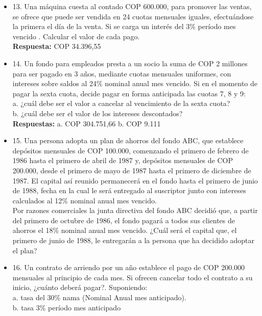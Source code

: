 \begin{itemize}
 \item 13. Una máquina cuesta al contado COP 600.000, para promover las ventas, se ofrece que puede ser vendida en 24 cuotas mensuales iguales, efectuándose la primera el día de la venta. Si se carga un interés del 3\% período mes vencido . Calcular el valor de cada pago.\\
       \textbf{Respuesta:} COP 34.396,55\\
       \medskip

 \item 14. Un fondo para empleados presta a un socio la suma de COP 2 millones para ser pagado en 3 años, mediante cuotas mensuales uniformes, con intereses sobre saldos al 24\% nominal anual mes vencido. Si en el momento de pagar la sexta cuota, decide pagar en forma anticipada las cuotas 7, 8 y 9:\\
       a. ¿cuál debe ser el valor a cancelar al vencimiento de la sexta cuota?\\
       b. ¿cuál debe ser el valor de los intereses descontados?\\
       \textbf{Respuestas:} a. COP 304.751,66 \hspace{1,5cm}b. COP 9.111\\
       \medskip

 \item 15. Una  persona adopta un plan de ahorros del fondo ABC, que establece depósitos mensuales de COP 100.000, comenzando el primero de febrero de 1986 hasta el primero de abril de 1987 y, depósitos mensuales de COP 200.000, desde el primero de mayo de 1987 hasta el primero de diciembre de 1987. El capital así reunido permanecerá en el fondo hasta el primero de junio de 1988, fecha en la cual le será entregado al suscriptor junto con intereses calculados al 12\% nominal anual mes vencido. \\
       Por razones comerciales la junta directiva del fondo ABC decidió que, a partir del primero de octubre de 1986, el fondo pagará a todos sus clientes de ahorros el 18\% nominal anual mes vencido. ¿Cuál será el capital que, el primero de junio de 1988, le entregarán a la persona que ha decidido adoptar el plan?\\
       \medskip

 \item 16. Un contrato de arriendo por un año establece el pago de COP 200.000 mensuales al principio de cada mes. Si ofrecen cancelar todo el contrato a su inicio, ¿cuánto deberá pagar?. Suponiendo:\\
       a. tasa del 30\% nama (Nominal Anual mes anticipado).\\
       b. tasa 3\% período mes anticipado \\
       \medskip


\end{itemize}
